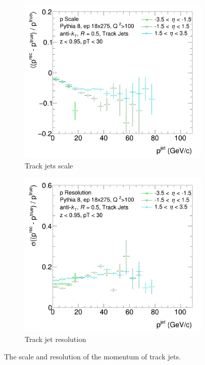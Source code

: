 \begin{figure}
    \centering
    \begin{subfigure}{0.4\textwidth}
        \centering
        \includegraphics[width=\linewidth]{figs/jet_plots/pScale_track_grouped.png}
        \caption{Track jets scale}
        \label{fig:track_momentum_scale}
    \end{subfigure}
    \hfill
    \begin{subfigure}{0.4\textwidth}
        \centering
        \includegraphics[width=\linewidth]{figs/jet_plots/pReso_track_grouped.png}
        \caption{Track jet resolution}
        \label{fig:track_momentum_resolution}
    \end{subfigure}
    \caption{The scale and resolution of the momentum of track jets.}
    \label{fig:track_momentum_reso_scale}
\end{figure}

